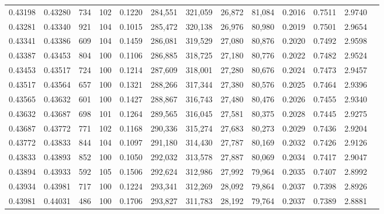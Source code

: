 \begin{tabular}{rrrrrrrrrrrrr}
0.43198 & 0.43280 &   734 & 102 &                                     0.1220 & 284,551 & 321,059 &  26,872 &  81,084 & 0.2016 & 0.7511 & 2.9740 \\
0.43281 & 0.43340 &   921 & 104 &                                     0.1015 & 285,472 & 320,138 &  26,976 &  80,980 & 0.2019 & 0.7501 & 2.9654 \\
0.43341 & 0.43386 &   609 & 104 &                                     0.1459 & 286,081 & 319,529 &  27,080 &  80,876 & 0.2020 & 0.7492 & 2.9598 \\
0.43387 & 0.43453 &   804 & 100 &                                     0.1106 & 286,885 & 318,725 &  27,180 &  80,776 & 0.2022 & 0.7482 & 2.9524 \\
0.43453 & 0.43517 &   724 & 100 &                                     0.1214 & 287,609 & 318,001 &  27,280 &  80,676 & 0.2024 & 0.7473 & 2.9457 \\
0.43517 & 0.43564 &   657 & 100 &                                     0.1321 & 288,266 & 317,344 &  27,380 &  80,576 & 0.2025 & 0.7464 & 2.9396 \\
0.43565 & 0.43632 &   601 & 100 &                                     0.1427 & 288,867 & 316,743 &  27,480 &  80,476 & 0.2026 & 0.7455 & 2.9340 \\
0.43632 & 0.43687 &   698 & 101 &                                     0.1264 & 289,565 & 316,045 &  27,581 &  80,375 & 0.2028 & 0.7445 & 2.9275 \\
0.43687 & 0.43772 &   771 & 102 &                                     0.1168 & 290,336 & 315,274 &  27,683 &  80,273 & 0.2029 & 0.7436 & 2.9204 \\
0.43772 & 0.43833 &   844 & 104 &                                     0.1097 & 291,180 & 314,430 &  27,787 &  80,169 & 0.2032 & 0.7426 & 2.9126 \\
0.43833 & 0.43893 &   852 & 100 &                                     0.1050 & 292,032 & 313,578 &  27,887 &  80,069 & 0.2034 & 0.7417 & 2.9047 \\
0.43894 & 0.43933 &   592 & 105 &                                     0.1506 & 292,624 & 312,986 &  27,992 &  79,964 & 0.2035 & 0.7407 & 2.8992 \\
0.43934 & 0.43981 &   717 & 100 &                                     0.1224 & 293,341 & 312,269 &  28,092 &  79,864 & 0.2037 & 0.7398 & 2.8926 \\
0.43981 & 0.44031 &   486 & 100 &                                     0.1706 & 293,827 & 311,783 &  28,192 &  79,764 & 0.2037 & 0.7389 & 2.8881 \\

\end{tabular}

